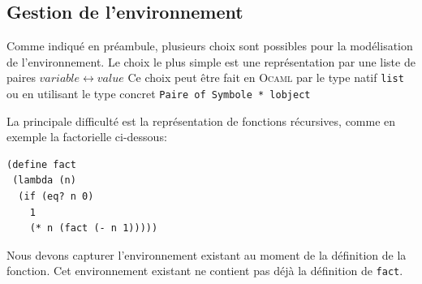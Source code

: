 \subsection{Gestion de l'environnement}

Comme indiqué en préambule, plusieurs choix sont possibles pour la modélisation de l'environnement.
Le choix le plus simple est une représentation par une liste de paires $variable \leftrightarrow  value$
Ce choix peut être fait en \textsc{Ocaml} par le type natif \verb+list+ ou en utilisant le type concret \verb+Paire of Symbole * lobject+

La principale difficulté est la représentation de fonctions récursives, comme en exemple la factorielle ci-dessous:
\begin{verbatim}
(define fact 
 (lambda (n) 
  (if (eq? n 0) 
    1
    (* n (fact (- n 1)))))
\end{verbatim}
Nous devons capturer l'environnement existant au moment de la définition de la fonction.
Cet environnement existant ne contient pas déjà la définition de \verb+fact+.

